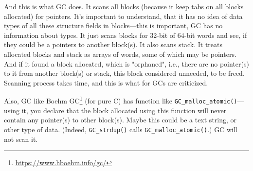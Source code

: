 And this is what \ac{GC} does.
It scans all blocks (because it keep tabs on all blocks allocated) for pointers.
It's important to understand, that it has no idea of data types of all these structure fields in blocks---this is important, \ac{GC} has no information about types.
It just scans blocks for 32-bit of 64-bit words and see, if they could be a pointers to another block(s).
It also scans stack.
It treats allocated blocks and stack as arrays of words, some of which may be pointers.
And if it found a block allocated, which is "orphaned", i.e., there are no pointer(s) to it from another block(s) or stack, this block considered unneeded, to be freed.
Scanning process takes time, and this is what for \ac{GC}s are criticized.

Also, \ac{GC} like Boehm GC\footnote{\url{https://www.hboehm.info/gc/}} (for pure C) has function like \verb|GC_malloc_atomic()|---using it, you declare that the block allocated
using this function will never contain any pointer(s) to other block(s).
Maybe this could be a text string, or other type of data.
(Indeed, \verb|GC_strdup()| calls \verb|GC_malloc_atomic()|.)
\ac{GC} will not scan it.


